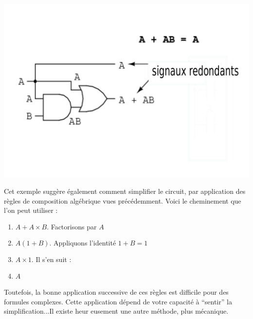 \begin{center}
\includegraphics[scale=0.2]{./figures/redondance.png}
\end{center}

Cet exemple suggère également comment simplifier le circuit, par application des règles de composition algébrique vues précédemment. Voici le cheminement que l'on peut utiliser :
\begin{enumerate}
\item $A+A\times B$. Factorisons par $A$
\item $A(1+B)$. Appliquons l'identité $1+B=1$
\item $A\times 1$. Il s'en suit :
\item $A$
\end{enumerate}

Toutefois, la bonne application successive de ces règles est difficile pour des formules complexes. Cette application dépend de votre capacité à ``sentir'' la simplification...Il existe heur
eusement une autre méthode, plus mécanique.

